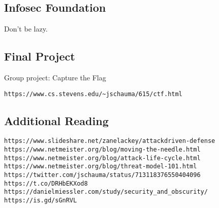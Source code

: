 \documentclass[xga]{xdvislides}
\begin{document}
\subsection{Infosec Foundation}
\vspace*{\fill}
\Huge
\begin{center}
	Don't be lazy.
\end{center}
\Normalsize
\vspace*{\fill}

\subsection{Final Project}
Group project: Capture the Flag \\

\vspace{.5in}
\begin{verbatim}
https://www.cs.stevens.edu/~jschauma/615/ctf.html
\end{verbatim}

\subsection{Additional Reading}
\begin{verbatim}
https://www.slideshare.net/zanelackey/attackdriven-defense
https://www.netmeister.org/blog/moving-the-needle.html
https://www.netmeister.org/blog/attack-life-cycle.html
https://www.netmeister.org/blog/threat-model-101.html
https://twitter.com/jschauma/status/713118376550404096
https://t.co/DRHbEKXod8
https://danielmiessler.com/study/security_and_obscurity/
https://is.gd/sGnRVL
\end{verbatim}
\end{document}
